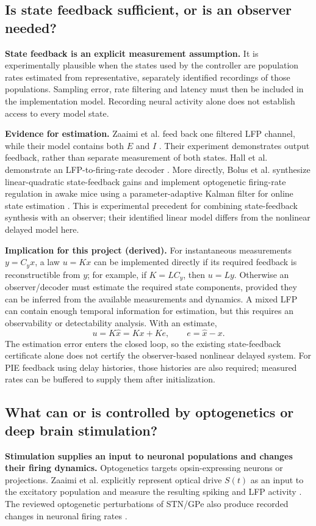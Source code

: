 ﻿\documentclass[11pt,a4paper]{article}
\begin{document}
\subsection*{Is state feedback sufficient, or is an observer needed?}
\textbf{State feedback is an explicit measurement assumption.}
It is experimentally plausible when the states used by the controller
are population rates estimated from representative, separately
identified recordings of those populations. Sampling error, rate
filtering and latency must then be included in the implementation
model. Recording neural activity alone does not establish access to
every model state.

\textbf{Evidence for estimation.} Zaaimi et al. feed back one filtered
LFP channel, while their model contains both $E$ and $I$
\cite[PDF pp.~2, 9, 14--15]{zaaimi2023}. Their experiment demonstrates
output feedback, rather than separate measurement of both states.
Hall et al. demonstrate an LFP-to-firing-rate decoder
\cite{hall2014}. More directly, Bolus et al. synthesize linear-quadratic
state-feedback gains and implement optogenetic firing-rate regulation
in awake mice using a parameter-adaptive Kalman filter for online
state estimation \cite[Secs.~2.5--2.6]{bolus2021}. This is experimental
precedent for combining state-feedback synthesis with an observer;
their identified linear model differs from the nonlinear delayed model
here.

\textbf{Implication for this project (derived).} For instantaneous
measurements $y=C_yx$, a law $u=Kx$ can be implemented directly if its
required feedback is reconstructible from $y$; for example, if
$K=L C_y$, then $u=Ly$. Otherwise an observer/decoder must estimate
the required state components, provided they can be inferred from the
available measurements and dynamics. A mixed LFP can contain enough
temporal information for estimation, but this requires an observability
or detectability analysis. With an estimate,
\begin{equation*}
u=K\widehat x=Kx+Ke,\qquad e=\widehat x-x.
\end{equation*}
The estimation error enters the closed loop, so the existing
state-feedback certificate alone does not certify the observer-based
nonlinear delayed system. For PIE feedback using delay histories,
those histories are also required; measured rates can be buffered to
supply them after initialization.

\subsection*{What can or is controlled by optogenetics or deep brain stimulation?}
\textbf{Stimulation supplies an input to neuronal populations and changes
their firing dynamics.} Optogenetics targets opsin-expressing neurons
or projections. Zaaimi et al. explicitly represent optical drive $S(t)$
as an input to the excitatory population and measure the resulting
spiking and LFP activity \cite[PDF pp.~2, 5, 15]{zaaimi2023}.
The reviewed optogenetic perturbations of STN/GPe also produce recorded
changes in neuronal firing rates \cite[PDF pp.~6--8]{delacrompe2025}.
\end{document}
